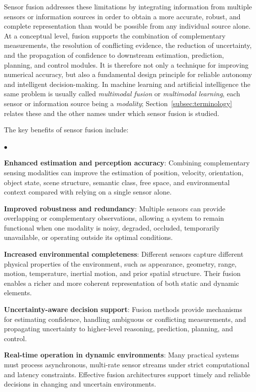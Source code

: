 \documentclass[graybox,envcountchap]{style/SNmono}
\newenvironment{list4a}{
  \begin{list}{$\bullet$}{
      \setlength{\itemsep}{0.05cm}
      \setlength{\labelsep}{0.2cm}
      \setlength{\labelwidth}{0.3cm}
      \setlength{\parsep}{0in}
      \setlength{\parskip}{0in}
      \setlength{\topsep}{0in}
      \setlength{\partopsep}{0in}
      \setlength{\leftmargin}{0.16in}}}
      {\end{list}}
\begin{document}
Sensor fusion addresses these limitations by integrating information from multiple sensors or information sources in order to obtain a more accurate, robust, and complete representation than would be possible from any individual source alone. At a conceptual level, fusion supports the combination of complementary measurements, the resolution of conflicting evidence, the reduction of uncertainty, and the propagation of confidence to downstream estimation, prediction, planning, and control modules. It is therefore not only a technique for improving numerical accuracy, but also a fundamental design principle for reliable autonomy and intelligent decision-making. In machine learning and artificial intelligence the same problem is usually called \emph{multimodal fusion} or \emph{multimodal learning}, each sensor or information source being a \emph{modality}; Section~\ref{subsec:terminology} relates these and the other names under which sensor fusion is studied.

The key benefits of sensor fusion include:
\begin{list4a}
    \item \textbf{Enhanced estimation and perception accuracy}: Combining complementary sensing modalities can improve the estimation of position, velocity, orientation, object state, scene structure, semantic class, free space, and environmental context compared with relying on a single sensor alone.
    \item \textbf{Improved robustness and redundancy}: Multiple sensors can provide overlapping or complementary observations, allowing a system to remain functional when one modality is noisy, degraded, occluded, temporarily unavailable, or operating outside its optimal conditions.
    \item \textbf{Increased environmental completeness}: Different sensors capture different physical properties of the environment, such as appearance, geometry, range, motion, temperature, inertial motion, and prior spatial structure. Their fusion enables a richer and more coherent representation of both static and dynamic elements.
    \item \textbf{Uncertainty-aware decision support}: Fusion methods provide mechanisms for estimating confidence, handling ambiguous or conflicting measurements, and propagating uncertainty to higher-level reasoning, prediction, planning, and control.
    \item \textbf{Real-time operation in dynamic environments}: Many practical systems must process asynchronous, multi-rate sensor streams under strict computational and latency constraints. Effective fusion architectures support timely and reliable decisions in changing and uncertain environments.
\end{list4a}
\end{document}
